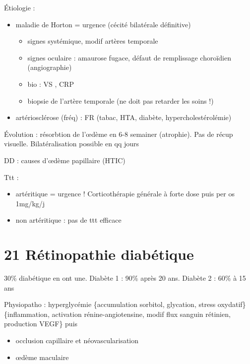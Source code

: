 \documentclass[11pt]{article}
\begin{document}
Étiologie : 
\begin{itemize}
\item maladie de Horton = urgence \skull (cécité bilatérale définitive) \thus 
\begin{itemize}
\item signes systémique, modif artères temporale
\item signes oculaire : amaurose fugace, défaut de remplissage choroïdien (angiographie)
\item bio : VS \inc[fn:24] , CRP \inc
\item biopsie de l'artère temporale (ne doit pas retarder les soins !)
\end{itemize}
\item artériosclérose (fréq) : FR (tabac, HTA, diabète, hypercholestérolémie)
\end{itemize}

Évolution : résorbtion de l'\oe{}dème en 6-8 semainer (atrophie). Pas de récup
visuelle. Bilatéralisation possible en qq jours \danger

DD : causes d'\oe{}dème papillaire (HTIC)

Ttt : 
\begin{itemize}
\item artéritique = urgence ! Corticothérapie générale à forte dose puis per os
1mg/kg/j
\item non artéritique : pas de ttt efficace
\end{itemize}

\section{21 Rétinopathie diabétique}
\label{sec:org6cbdec2}
30\% diabétique en ont une. Diabète 1 : 90\% après 20 ans. Diabète 2 : 60\% à 15
ans

Physiopatho : hyperglycémie \thus \{accumulation sorbitol, glycation, stress
oxydatif\} \thus \{inflammation, activation rénine-angiotensine, modif flux
sanguin rétinien, production VEGF\} puis 
\begin{itemize}
\item occlusion capillaire et néovascularisation
\item \oe{}dème maculaire
\end{itemize}
\end{document}
